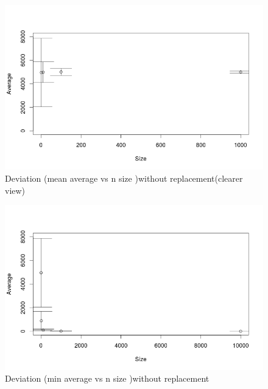 \documentclass{article}
\begin{document}
	\begin{figure}[H]
		\begin{center}
			\includegraphics[scale=0.7]{plotmean4no.png}
		\end{center}
		\caption{Deviation (mean average vs n size )without replacement(clearer view)}
	\end{figure}
	
	\begin{figure}[H]
		\begin{center}
			\includegraphics[scale=0.7]{plotminallno.png}
		\end{center}
		\caption{Deviation (min average vs n size )without replacement}
	\end{figure}
	
\end{document}
